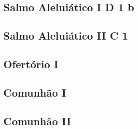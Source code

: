 \subsection[Salmo Aleluiático I]{Salmo Aleluiático I \textmd{D 1 b}}\label{subsection:communia/commune-sanctorum/psalmus-alleluiaticus-1}

\AllowPageFlush

\subsection[Salmo Aleluiático II]{Salmo Aleluiático II \textmd{C 1}}\label{subsection:communia/commune-sanctorum/psalmus-alleluiaticus-2}

\AllowPageFlush

\subsection{Ofertório I}\label{subsection:communia/commune-sanctorum/offertorium-1}

\AllowPageFlush

\label{subsection:communia/commune-sanctorum/offertorium-2}

\AllowPageBreak

\subsection{Comunhão I}\label{subsection:communia/commune-sanctorum/communio-1}

\AllowPageFlush

\subsection{Comunhão II}\label{subsection:communia/commune-sanctorum/communio-2}
